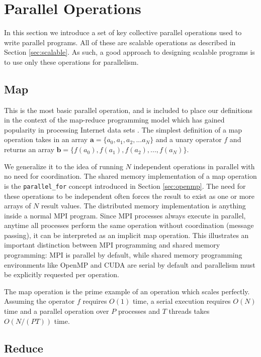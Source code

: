 \section{Parallel Operations}
\label{sec:paraops}

In this section we introduce a set of key collective parallel operations
used to write parallel programs.
All of these are scalable operations as described in Section \ref{sec:scalable}.
As such, a good approach to designing scalable programs is to use
only these operations for parallelism.

\subsection{Map}
\label{sec:map}

This is the most basic parallel operation, and is included to
place our definitions in the context of the map-reduce programming model which
has gained popularity in processing Internet data sets \cite{dean2008mapreduce}.
The simplest definition of a map operation takes in an array $\mathbf{a}=\{a_0,a_1,a_2,...a_N\}$
and a unary operator $f$ and returns an array
$\mathbf{b}=\{f(a_0), f(a_1), f(a_2),...,f(a_N)\}$.

We generalize it to the idea of running $N$ independent
operations in parallel with no need for coordination.
The shared memory implementation of a map operation is the \texttt{parallel\_for}
concept introduced in Section \ref{sec:openmp}.
The need for these operations to be independent often forces the result to exist
as one or more arrays of $N$ result values.
The distributed memory implementation is anything inside a normal MPI program.
Since MPI processes always execute in parallel, anytime all processes perform
the same operation without coordination (message passing), it can be interpreted
as an implicit map operation.
This illustrates an important distinction between MPI programming and shared
memory programming: MPI is parallel by default, while shared memory programming
environments like OpenMP and CUDA are serial by default and parallelism
must be explicitly requested per operation.

The map operation is the prime example of an operation which scales
perfectly.
Assuming the operator $f$ requires $O(1)$ time, a serial execution
requires $O(N)$ time and a parallel operation over $P$ processes
and $T$ threads takes $O(N/(PT))$ time.

\subsection{Reduce}
\label{sec:reduce}

